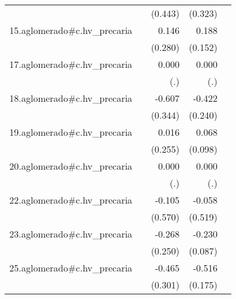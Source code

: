 {\begin{longtable}{l*{4}{D{.}{.}{-1}}}
            &                     &     (0.443)         &     (0.323)         &                     \\
\addlinespace
15.aglomerado#c.hv\_precaria&                     &       0.146         &       0.188         &                     \\
            &                     &     (0.280)         &     (0.152)         &                     \\
\addlinespace
17.aglomerado#c.hv\_precaria&                     &       0.000         &       0.000         &                     \\
            &                     &         (.)         &         (.)         &                     \\
\addlinespace
18.aglomerado#c.hv\_precaria&                     &      -0.607         &      -0.422         &                     \\
            &                     &     (0.344)         &     (0.240)         &                     \\
\addlinespace
19.aglomerado#c.hv\_precaria&                     &       0.016         &       0.068         &                     \\
            &                     &     (0.255)         &     (0.098)         &                     \\
\addlinespace
20.aglomerado#c.hv\_precaria&                     &       0.000         &       0.000         &                     \\
            &                     &         (.)         &         (.)         &                     \\
\addlinespace
22.aglomerado#c.hv\_precaria&                     &      -0.105         &      -0.058         &                     \\
            &                     &     (0.570)         &     (0.519)         &                     \\
\addlinespace
23.aglomerado#c.hv\_precaria&                     &      -0.268         &      -0.230\sym{**} &                     \\
            &                     &     (0.250)         &     (0.087)         &                     \\
\addlinespace
25.aglomerado#c.hv\_precaria&                     &      -0.465         &      -0.516\sym{**} &                     \\
            &                     &     (0.301)         &     (0.175)         &                     \\

\end{longtable}}
